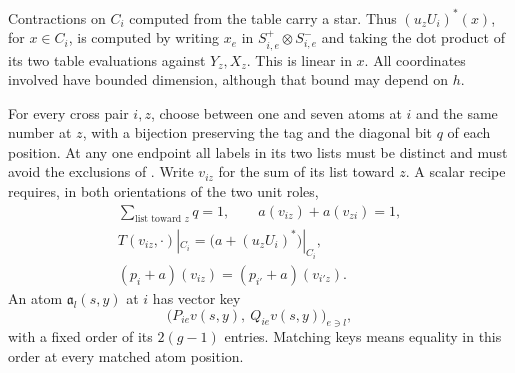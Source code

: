 Contractions on $C_i$ computed from the table carry a star.
Thus $(u_zU_i)^*(x)$, for $x\in C_i$, is computed by writing
$x_e$ in $S_{i,e}^+\otimes S_{i,e}^-$ and taking the dot product
of its two table evaluations against $Y_z,X_z$.
This is linear in $x$.  All coordinates involved have bounded
dimension, although that bound may depend on $h$.

For every cross pair $i,z$, choose between one and seven atoms
at $i$ and the same number at $z$, with a bijection preserving
the tag and the diagonal bit $q$ of each position.  At any
one endpoint all labels in its two lists must be distinct and
must avoid the exclusions of .
Write $v_{iz}$ for the sum of its list toward $z$.  A scalar
recipe requires, in both orientations of the two unit roles,
\begin{equation}\label{eq:recipe-scalars}
 \begin{gathered}
 \sum_{\text{list toward }z}q=1,
 \qquad a(v_{iz})+a(v_{zi})=1,\\
 T(v_{iz},\cdot)|_{C_i}
       =\bigl(a+(u_zU_i)^*\bigr)|_{C_i},\\
 (p_i+a)(v_{iz})=(p_{i'}+a)(v_{i'z}).
 \end{gathered}
\end{equation}
An atom $\mathfrak a_l(s,y)$ at $i$ has vector key
\[
 \bigl(P_{ie}v(s,y),\ Q_{ie}v(s,y)\bigr)_{e\ni l},
\]
with a fixed order of its $2(g-1)$ entries.  Matching keys means
equality in this order at every matched atom position.

